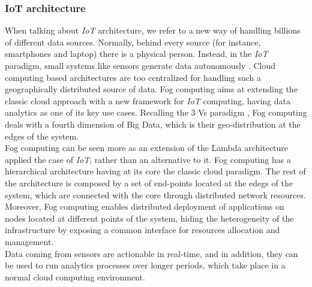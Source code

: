 \subsubsection{IoT architecture}
When talking about \textit{IoT} architecture, we refer to a new way of handling billions of different data sources. Normally, behind every source (for instance, smartphones and laptop) there is a physical person. Instead, in the \textit{IoT} paradigm, small systems like sensors generate data autonomously \cite{bib34}. Cloud computing based architectures are too centralized for handling such a geographically distributed source of data. Fog computing \cite{bib51} aims at extending the classic cloud approach with a new framework for \textit{IoT} computing, having data analytics as one of its key use cases. Recalling the 3 Vs paradigm \cite{bib12}, Fog computing deals with a fourth dimension of Big Data, which is their geo-distribution at the edges of the system.\\
Fog computing can be seen more as an extension of the Lambda architecture applied the case of \textit{IoT}, rather than an alternative to   it. Fog computing has a hierarchical architecture having at its core the classic cloud paradigm. The rest of the architecture is composed by a set of end-points located at the edegs of the system, which are connected with the core through distributed network resources.
Moreover, Fog computing enables distributed deployment of applications on nodes located at different points of the system, hiding the heterogeneity of   the infrastructure by exposing a common interface for resources allocation and management.\\
Data coming from sensors are actionable in real-time, and in addition, they can be used to run analytics processes over longer periods, which take place in a normal cloud computing environment.

